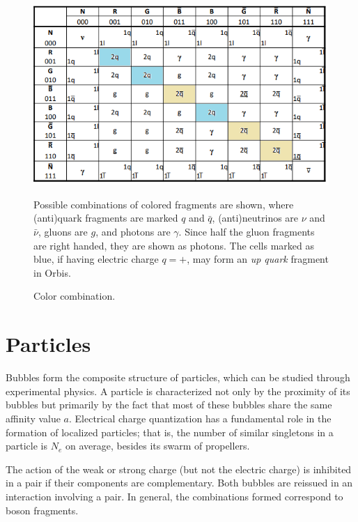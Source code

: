 \documentclass[12pt]{article}
\begin{document}
\begin{figure}
\caption{Color combination.\label{fig:color-combination}}
\medskip{}

\begin{centering}
\includegraphics[width=\linewidth]{fig4}
\par\end{centering}
\medskip{}

{\small{}Possible combinations of colored fragments are shown, where (anti)quark fragments are marked $q$ and $\bar{q}$, (anti)neutrinos are $\nu$ and $\bar{\nu}$, gluons are $g$, and photons are $\gamma$. Since half the gluon fragments are right handed, they are shown as photons. The cells marked as blue, if having electric charge $q=+$, may form an }\emph{\small{}up quark}{\small{} fragment in Orbis.}{\small\par}
\end{figure}


\section{Particles\label{sec:Particles}}

Bubbles form the composite structure of particles, which can be studied through experimental physics. A particle is characterized not only by the proximity of its bubbles but primarily by the fact that most of these bubbles share the same affinity value \( a \). Electrical charge quantization has a fundamental role in the formation of localized particles; that is, the number of similar singletons in a particle is $N_e$ on average, besides its swarm of propellers.

The action of the weak or strong charge (but not the electric charge) is inhibited in a pair if their components are complementary. Both bubbles are reissued in an interaction involving a pair. In general, the combinations formed correspond to boson fragments.
\end{document}
